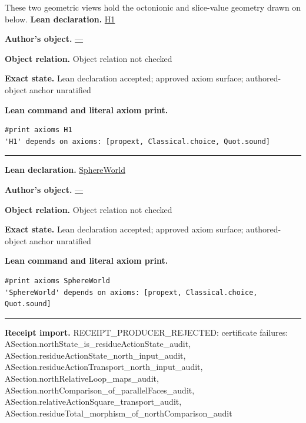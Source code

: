 \documentclass[11pt]{article}
\theoremstyle{plain}
\theoremstyle{definition}
\theoremstyle{remark}
\begin{document}
\begin{tcolorbox}[provenancecard,title={39. Definition - The octonionic and slice-value worlds},title after break={39. Definition - The octonionic and slice-value worlds (continued)}]
These two geometric views hold the octonionic and slice-value geometry drawn on below.
\tcblower
\textbf{Lean declaration.} \url{H1}
\par\textbf{Author's object.} \url{—}
\par\textbf{Object relation.} Object relation not checked
\par\textbf{Exact state.} Lean declaration accepted; approved axiom surface; authored-object anchor unratified
\par\smallskip\textbf{Lean command and literal axiom print.}
\begin{Verbatim}[breaklines=true,breakanywhere=true,fontsize=\small]
#print axioms H1
'H1' depends on axioms: [propext, Classical.choice, Quot.sound]
\end{Verbatim}
\medskip\hrule\medskip
\textbf{Lean declaration.} \url{SphereWorld}
\par\textbf{Author's object.} \url{—}
\par\textbf{Object relation.} Object relation not checked
\par\textbf{Exact state.} Lean declaration accepted; approved axiom surface; authored-object anchor unratified
\par\smallskip\textbf{Lean command and literal axiom print.}
\begin{Verbatim}[breaklines=true,breakanywhere=true,fontsize=\small]
#print axioms SphereWorld
'SphereWorld' depends on axioms: [propext, Classical.choice, Quot.sound]
\end{Verbatim}
\medskip\hrule\medskip
\textbf{Receipt import.} \textcolor{KgtRed}{RECEIPT\_PRODUCER\_REJECTED: certificate failures: ASection.northState\_is\_residueActionState\_audit, ASection.residueActionState\_north\_input\_audit, ASection.residueActionTransport\_north\_input\_audit, ASection.northRelativeLoop\_maps\_audit, ASection.northComparison\_of\_parallelFaces\_audit, ASection.relativeActionSquare\_transport\_audit, ASection.residueTotal\_morphism\_of\_northComparison\_audit}
\end{tcolorbox}
\medskip
\end{document}
